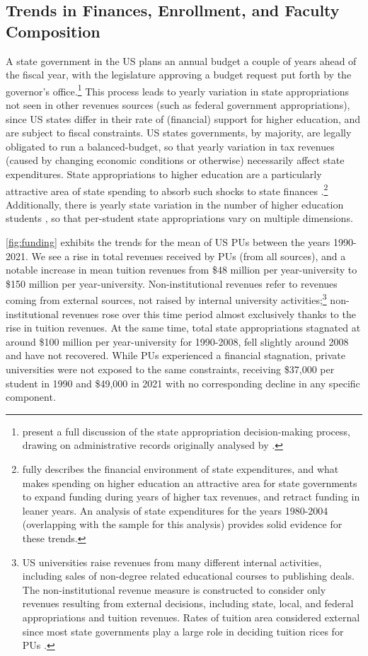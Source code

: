 \documentclass[notitlepage,12pt]{article}
\begin{document}
\subsection{Trends in Finances, Enrollment, and Faculty Composition}
\label{sec:trends}
A state government in the US plans an annual budget a couple of years ahead of the fiscal year, with the legislature approving a budget request put forth by the governor's office.\footnote{
    \cite{NBERw23736} present a full discussion of the state appropriation decision-making process, drawing on administrative records originally analysed by \cite{parmley2009state}.}
This process leads to yearly variation in state appropriations not seen in other revenues sources (such as federal government appropriations), since US states differ in their rate of (financial) support for higher education, and are subject to fiscal constraints.
US states governments, by majority, are legally obligated to run a balanced-budget, so that yearly variation in tax revenues (caused by changing economic conditions or otherwise) necessarily affect state expenditures.
State appropriations to higher education are a particularly attractive area of state spending to absorb such shocks to state finances \citep{delaney2011state}.\footnote{
    \cite{delaney2011state} fully describes the financial environment of state expenditures, and what makes spending on higher education an attractive area for state governments to expand funding during years of higher tax revenues, and retract funding in leaner years.
    An analysis of state expenditures for the years 1980-2004 (overlapping with the sample for this analysis) provides solid evidence for these trends.
}
Additionally, there is yearly state variation in the number of higher education students \citep{turner2014impact}, so that per-student state appropriations vary on multiple dimensions.

\autoref{fig:funding} exhibits the trends for the mean of US PUs between the years 1990-2021.
We see a rise in total revenues received by PUs (from all sources), and a notable increase in mean tuition revenues from \$48 million per year-university to \$150 million per year-university. 
Non-institutional revenues refer to revenues coming from external sources, not raised by internal university activities;\footnote{
    US universities raise revenues from many different internal activities, including sales of non-degree related educational courses to publishing deals.
    The non-institutional revenue measure is constructed to consider only revenues resulting from external decisions, including state, local, and federal appropriations and tuition revenues.
    Rates of tuition area considered external since most state governments play a large role in deciding tuition rices for PUs \citep{NBERw23736}.
}
non-institutional revenues rose over this time period almost exclusively thanks to the rise in tuition revenues.
At the same time, total state appropriations stagnated at around \$100 million per year-university for 1990-2008, fell slightly around 2008 and have not recovered.
While PUs experienced a financial stagnation, private universities were not exposed to the same constraints, receiving \$37,000 per student in 1990 and \$49,000 in 2021 with no corresponding decline in any specific component.
\end{document}
